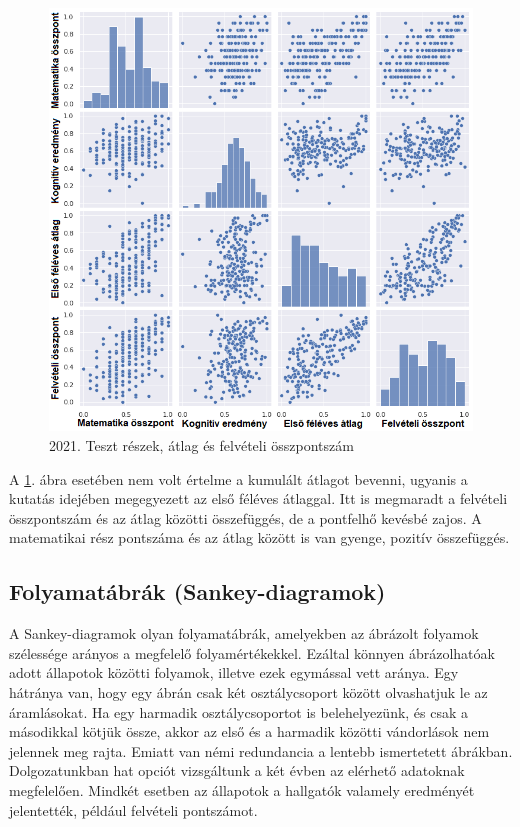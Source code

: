 \documentclass[12pt]{article}
\begin{document}
\begin{figure}[H]
\centering
\includegraphics[width=\textwidth]{kepek/2021minmax.png}
\caption{2021. Teszt részek, átlag és felvételi összpontszám}
\label{fig:2021minmax}
\end{figure}

A \ref{fig:2021minmax}. ábra esetében nem volt értelme a kumulált átlagot bevenni, ugyanis a kutatás idejében megegyezett az első féléves átlaggal. Itt is megmaradt a felvételi összpontszám és az átlag közötti összefüggés, de a pontfelhő kevésbé zajos. A matematikai rész pontszáma és az átlag között is van gyenge, pozitív összefüggés.



\subsection{Folyamatábrák (Sankey-diagramok)}
A Sankey-diagramok olyan folyamatábrák, amelyekben az ábrázolt folyamok szélessége arányos a megfelelő folyamértékekkel. Ezáltal könnyen ábrázolhatóak adott állapotok közötti folyamok, illetve ezek egymással vett aránya. Egy hátránya van, hogy egy ábrán csak két osztálycsoport között olvashatjuk le az áramlásokat. Ha egy harmadik osztálycsoportot is belehelyezünk, és csak a másodikkal kötjük össze, akkor az első és a harmadik közötti vándorlások nem jelennek meg rajta. Emiatt van némi redundancia a lentebb ismertetett ábrákban.\\
Dolgozatunkban hat opciót vizsgáltunk a két évben az elérhető adatoknak megfelelően. Mindkét esetben az állapotok a hallgatók valamely eredményét jelentették, például felvételi pontszámot.
\end{document}
